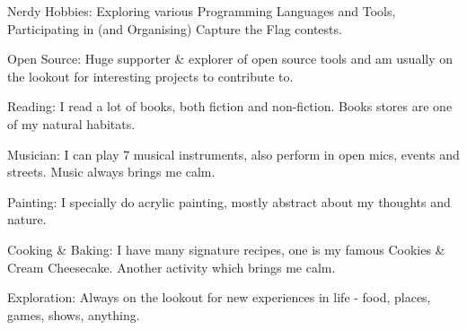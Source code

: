


\begin{cventries}
  \cventry
    {}
    {}
    {}
    {}
    {
      \vspace{-4.0mm}
      \begin{cvitems}
          \item Nerdy Hobbies: Exploring various Programming Languages and Tools, Participating in (and Organising) Capture the Flag contests.
          \item Open Source: Huge supporter \& explorer of open source tools and am usually on the lookout for interesting projects to contribute to.
          \item Reading: I read a lot of books, both fiction and non-fiction. Books stores are one of my natural habitats.
          \item Musician: I can play 7 musical instruments, also perform in open mics, events and streets. Music always brings me calm.
          \item Painting: I specially do acrylic painting, mostly abstract about my thoughts and nature.
          \item Cooking \& Baking: I have many signature recipes, one is my famous Cookies \& Cream Cheesecake. Another activity which brings me calm.
          \item Exploration: Always on the lookout for new experiences in life - food, places, games, shows, anything.
      \end{cvitems}
    }
\end{cventries}
